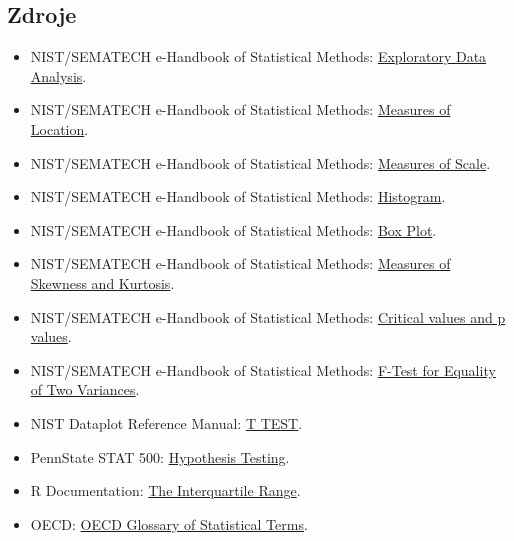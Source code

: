 \subsection{Zdroje}
\begin{itemize}
  \item NIST/SEMATECH e-Handbook of Statistical Methods: \href{https://itl.nist.gov/div898/handbook/eda/eda.htm}{Exploratory Data Analysis}.
  \item NIST/SEMATECH e-Handbook of Statistical Methods: \href{https://www.itl.nist.gov/div898/handbook/eda/section3/eda351.htm}{Measures of Location}.
  \item NIST/SEMATECH e-Handbook of Statistical Methods: \href{https://www.itl.nist.gov/div898/handbook/eda/section3/eda356.htm}{Measures of Scale}.
  \item NIST/SEMATECH e-Handbook of Statistical Methods: \href{https://www.itl.nist.gov/div898/handbook/eda/section3/histogra.htm}{Histogram}.
  \item NIST/SEMATECH e-Handbook of Statistical Methods: \href{https://www.itl.nist.gov/div898/handbook/eda/section3/boxplot.htm}{Box Plot}.
  \item NIST/SEMATECH e-Handbook of Statistical Methods: \href{https://www.itl.nist.gov/div898/handbook/eda/section3/eda35b.htm}{Measures of Skewness and Kurtosis}.
  \item NIST/SEMATECH e-Handbook of Statistical Methods: \href{https://www.itl.nist.gov/div898/handbook/prc/section1/prc131.htm}{Critical values and p values}.
  \item NIST/SEMATECH e-Handbook of Statistical Methods: \href{https://itl.nist.gov/div898/handbook/eda/section3/eda359.htm}{F-Test for Equality of Two Variances}.
  \item NIST Dataplot Reference Manual: \href{https://www.itl.nist.gov/div898/software/dataplot/refman1/auxillar/t\_test.htm}{T TEST}.
  \item PennState STAT 500: \href{https://online.stat.psu.edu/stat500/Lesson06.html}{Hypothesis Testing}.
  \item R Documentation: \href{https://stat.ethz.ch/R-manual/R-devel/library/stats/html/IQR.html}{The Interquartile Range}.
  \item OECD: \href{https://www.oecd.org/en/publications/oecd-glossary-of-statistical-terms_9789264055087-en.html}{OECD Glossary of Statistical Terms}.
\end{itemize}

\newpage
